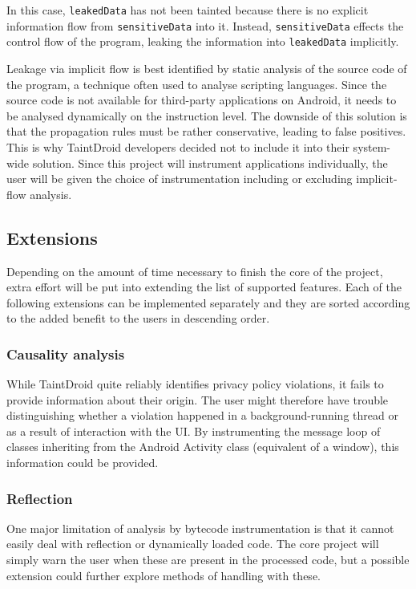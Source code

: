 \documentclass[12pt]{article}
\begin{document}
In this case, \verb|leakedData| has not been tainted because there is 
no explicit information flow from \verb|sensitiveData| into it. Instead, 
\verb|sensitiveData| effects the control flow of the program, leaking
the information into \verb|leakedData| implicitly. 

Leakage via implicit flow is best identified by static analysis of the 
source code of the program, a technique often used to analyse scripting
languages. Since the source code is not available for third-party 
applications on Android, it needs to be analysed dynamically on the 
instruction level. The downside of this solution is that the propagation 
rules must be rather conservative, leading to false positives. This is 
why TaintDroid developers decided not to include it into their
system-wide solution. Since this project will instrument applications
individually, the user will be given the choice of instrumentation 
including or excluding implicit-flow analysis.

\subsection*{Extensions}

Depending on the amount of time necessary to finish the core of the project,
extra effort will be put into extending the list of supported features. Each 
of the following extensions can be implemented separately and they are 
sorted according to the added benefit to the users in descending order.

\subsubsection*{Causality analysis}

While TaintDroid quite reliably identifies privacy policy violations,
it fails to provide information about their origin. The user might therefore 
have trouble distinguishing whether a violation happened in a 
background-running thread or as a result of interaction with the UI. 
By instrumenting the message loop of classes inheriting from the Android 
Activity class (equivalent of a window), this information could be provided.

\subsubsection*{Reflection}

One major limitation of analysis by bytecode instrumentation is that it 
cannot easily deal with reflection or dynamically loaded code. The core
project will simply warn the user when these are present in the processed
code, but a possible extension could further explore methods of handling 
with these.
\end{document}
